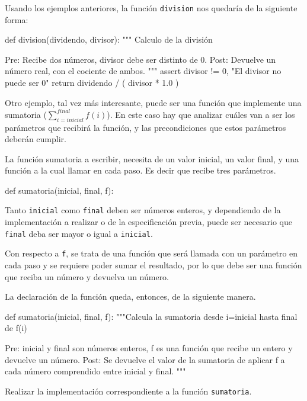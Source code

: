 Usando los ejemplos anteriores, la función \lstinline!division! nos
quedaría de la siguiente forma:

\begin{codigo-python-sn}
def division(dividendo, divisor):
    """ Calculo de la división

    Pre: Recibe dos números, divisor debe ser distinto de 0.
    Post: Devuelve un número real, con el cociente de ambos.
    """
    assert divisor != 0, "El divisor no puede ser 0"
    return dividendo  / ( divisor * 1.0 )
\end{codigo-python-sn}

Otro ejemplo, tal vez más interesante, puede ser una función que implemente
una sumatoria ($\sum_{i=inicial}^{final} f(i)$).  En este caso hay que
analizar cuáles van a ser los parámetros que recibirá la función, y las
precondiciones que estos parámetros deberán cumplir.

La función sumatoria a escribir, necesita de un valor inicial, un valor
final, y una función a la cual llamar en cada paso. Es decir que recibe
tres parámetros.

\begin{codigo-python-sn}
def sumatoria(inicial, final, f):
\end{codigo-python-sn}

Tanto \lstinline!inicial! como \lstinline!final! deben ser números enteros,
y dependiendo de la implementación a realizar o de la especificación
previa, puede ser necesario que \lstinline!final! deba ser mayor o igual a
\lstinline!inicial!.

Con respecto a \lstinline!f!, se trata de una función que será llamada con
un parámetro en cada paso y se requiere poder sumar el resultado, por lo
que debe ser una función que reciba un número y devuelva un número.

La declaración de la función queda, entonces, de la siguiente manera.

\begin{codigo-python-sn}
def sumatoria(inicial, final, f):
    """Calcula la sumatoria desde i=inicial hasta final de f(i)

    Pre: inicial y final son números enteros, f es una función que
         recibe un entero y devuelve un número.
    Post: Se devuelve el valor de la sumatoria de aplicar f a cada
          número comprendido entre inicial y final.
	"""
\end{codigo-python-sn}

\begin{ejercicio}
Realizar la implementación correspondiente a la función \lstinline!sumatoria!.
\end{ejercicio}


